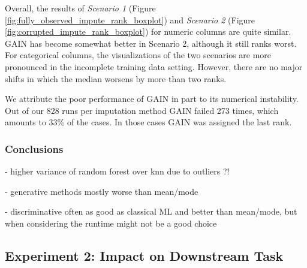 Overall, the results of \textit{Scenario 1} (Figure \ref{fig:fully_observed_impute_rank_boxplot}) and \textit{Scenario 2} (Figure \ref{fig:corrupted_impute_rank_boxplot}) for numeric columns are quite similar. GAIN has become somewhat better in Scenario 2, although it still ranks worst. For categorical columns, the visualizations of the two scenarios are more pronounced in the incomplete training data setting. However, there are no major shifts in which the median worsens by more than two ranks. 

We attribute the poor performance of GAIN in part to its numerical instability. Out of our 828 runs per imputation method GAIN failed 273 times, which amounts to 33\% of the cases. In those cases GAIN was assigned the last rank. 

\subsubsection{Conclusions}

- higher variance of random forest over knn due to outliers ?!

- generative methods mostly worse than mean/mode

- discriminative often as good as classical ML and better than mean/mode, but when considering the runtime might not be a good choice



\subsection{Experiment 2: Impact on Downstream Task}

